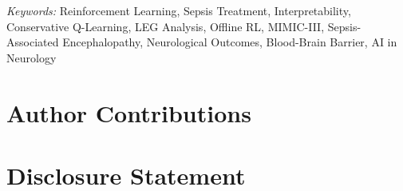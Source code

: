 \documentclass[11pt]{article}
\begin{document}
\noindent%
{\it Keywords:} Reinforcement Learning, Sepsis Treatment, Interpretability, Conservative Q-Learning, LEG Analysis, Offline RL, MIMIC-III, Sepsis-Associated Encephalopathy, Neurological Outcomes, Blood-Brain Barrier, AI in Neurology

\vfill
\newpage
{} %






















\section{Author Contributions}



\section{Disclosure Statement}
\end{document}
